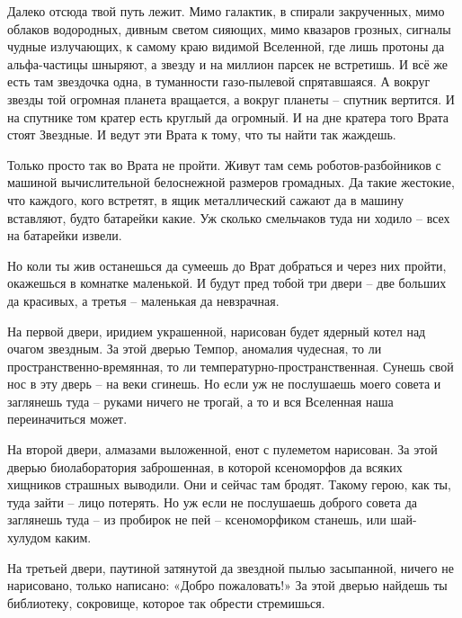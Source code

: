 \documentclass[ebook,oneside,final,openright]{memoir}
\begin{document}
\par
Далеко отсюда твой путь лежит. Мимо галактик, в спирали закрученных, мимо облаков водородных, дивным светом сияющих, мимо квазаров грозных, сигналы чудные излучающих, к самому краю видимой Вселенной, где лишь протоны да альфа-частицы шныряют, а звезду и на миллион парсек не встретишь. И всё же есть там звездочка одна, в туманности газо-пылевой спрятавшаяся. А вокруг звезды той огромная планета вращается, а вокруг планеты – спутник вертится. И на спутнике том кратер есть круглый да огромный. И на дне кратера того Врата стоят Звездные. И ведут эти Врата к тому, что ты найти так жаждешь.\par
\par
Только просто так во Врата не пройти. Живут там семь роботов-разбойников с машиной вычислительной белоснежной размеров громадных. Да такие жестокие, что каждого, кого встретят, в ящик металлический сажают да в машину вставляют, будто батарейки какие. Уж сколько смельчаков туда ни ходило – всех на батарейки извели.\par
\par
Но коли ты жив останешься да сумеешь до Врат добраться и через них пройти, окажешься в комнатке маленькой. И будут пред тобой три двери – две больших да красивых, а третья – маленькая да невзрачная.\par
\par
На первой двери, иридием украшенной, нарисован будет ядерный котел над очагом звездным. За этой дверью Темпор, аномалия чудесная, то ли пространственно-времянная, то ли температурно-пространственная. Сунешь свой нос в эту дверь – на веки сгинешь. Но если уж не послушаешь моего совета и заглянешь туда – руками ничего не трогай, а то и вся Вселенная наша переиначиться может.\par
\par
На второй двери, алмазами выложенной, енот с пулеметом нарисован. За этой дверью биолаборатория заброшенная, в которой ксеноморфов да всяких хищников страшных выводили. Они и сейчас там бродят. Такому герою, как ты, туда зайти – лицо потерять. Но уж если не послушаешь доброго совета да заглянешь туда – из пробирок не пей – ксеноморфиком станешь, или шай-хулудом каким.\par
\par
На третьей двери, паутиной затянутой да звездной пылью засыпанной, ничего не нарисовано, только написано: «Добро пожаловать!» За этой дверью найдешь ты библиотеку, сокровище, которое так обрести стремишься.\par
\par
\end{document}

